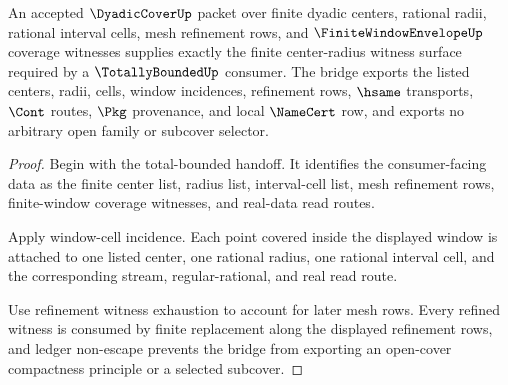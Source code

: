 \begin{theorem}
\label{thm:dyadic-cover-total-bounded-bridge}
An accepted $\DyadicCoverUp$ packet over finite dyadic centers, rational
radii, rational interval cells, mesh refinement rows, and
$\FiniteWindowEnvelopeUp$ coverage witnesses supplies exactly the finite
center-radius witness surface required by a $\TotallyBoundedUp$ consumer. The
bridge exports the listed centers, radii, cells, window incidences, refinement
rows, $\hsame$ transports, $\Cont$ routes, $\Pkg$ provenance, and local
$\NameCert$ row, and exports no arbitrary open family or subcover selector.
\end{theorem}
\begin{proof}
Begin with the total-bounded handoff. It identifies the consumer-facing data
as the finite center list, radius list, interval-cell list, mesh refinement
rows, finite-window coverage witnesses, and real-data read routes.

Apply window-cell incidence. Each point covered inside the displayed window is
attached to one listed center, one rational radius, one rational interval
cell, and the corresponding stream, regular-rational, and real read route.

Use refinement witness exhaustion to account for later mesh rows. Every
refined witness is consumed by finite replacement along the displayed
refinement rows, and ledger non-escape prevents the bridge from exporting an
open-cover compactness principle or a selected subcover.
\end{proof}

